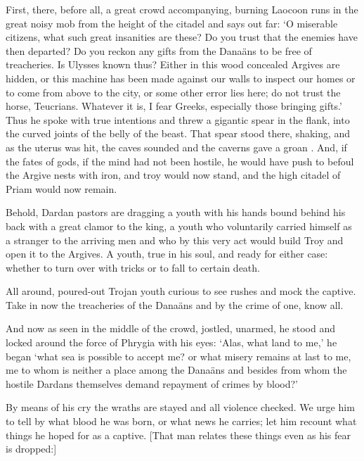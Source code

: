 First, there, before all, a great crowd accompanying, burning Laocoon runs in the great noisy mob from the
height of the citadel and says out far: `O miserable citizens, what such great insanities
are these?   Do you trust that the enemies have then departed?  Do you reckon any gifts from the
Dana\"ans to be free of treacheries.  Is Ulysses known thus?  Either in this wood concealed
Argives are hidden, or this machine has been made against our walls to inspect our homes
or to come from above to the city, or some
other error lies here; do not trust the horse, Teucrians.
Whatever it is, I fear Greeks, especially those bringing gifts.'
Thus he spoke with true intentions and threw
a gigantic spear in the flank, into the curved joints of the belly of the beast.  That spear 
stood there, shaking, and as the uterus was hit, the caves sounded and the caverns gave a groan .
And, if the fates of gods, if the mind had not been hostile, he would have push to
befoul the Argive nests with iron, and troy would now stand, and
the high citadel of Priam would now remain.

Behold, Dardan pastors are dragging a youth with his hands bound behind his 
back with a great clamor to the king, a youth who voluntarily carried
himself as a stranger to the arriving men and who by this very act would build Troy and open it to the 
Argives.  A youth, true in his soul, and ready for either case: whether to turn over with tricks or to
fall to certain death.

All around, poured-out Trojan youth curious to see rushes and
mock the captive.  Take in now the treacheries
of the Dana\"ans and by the crime of one, know all.

And now as seen in the middle of the crowd, jostled, unarmed,
he stood and locked around the force of Phrygia with his eyes:
`Alas, what land to me,' he began `what sea is possible to accept me?
or what misery remains at last to me, me to whom is neither
a place among the Dana\"ans and besides from whom the hostile
Dardans themselves demand repayment of crimes by blood?'

By means of his cry the wraths are stayed
and all violence checked.  We urge him to tell by what blood he
was born, or what news he carries; let him recount what things he 
hoped for as a captive.
[That man relates these things even as his fear is dropped:]
